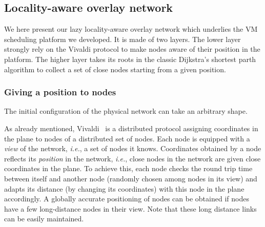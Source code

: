 

\subsection{Locality-aware  overlay network}


We here present our lazy locality-aware overlay network which underlies the VM
scheduling platform we developed. It is made of two layers. The lower layer
strongly rely on the Vivaldi protocol to make nodes aware of their position in
the platform. The higher layer takes its roots in the classic Dijkstra's
shortest parth algorithm to collect a set of close nodes starting from a given
position.


\subsubsection*{Giving a position to nodes}

The initial configuration of the physical network can take an arbitrary
shape.


As already mentioned, Vivaldi~\cite{dabek:2001:sigcomm04} is a
distributed protocol assigning coordinates in the plane to nodes of a
distributed set of nodes. Each node is equipped with a \emph{view} of the
network, \emph{i.e.}, a set of nodes it knows. Coordinates obtained by a node
reflects its \emph{position} in the network, \emph{i.e.}, close nodes in the
network are given close coordinates in the plane. To achieve this, each node
checks the round trip time between itself and another node (randomly chosen
among nodes in its view) and adapts its distance (by changing its coordinates)
with this node in the plane accordingly. %
A globally accurate positioning of nodes can be
obtained if nodes have a few long-distance nodes in their
view. Note that these long distance links can be easily
maintained.


